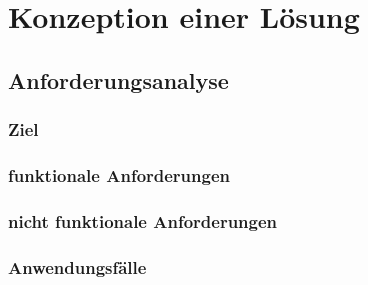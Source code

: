 \chapter{Konzeption einer Lösung}

\section{Anforderungsanalyse}
\subsection{Ziel}
\subsection{funktionale Anforderungen}
\subsection{nicht funktionale Anforderungen}
\subsection{Anwendungsfälle}